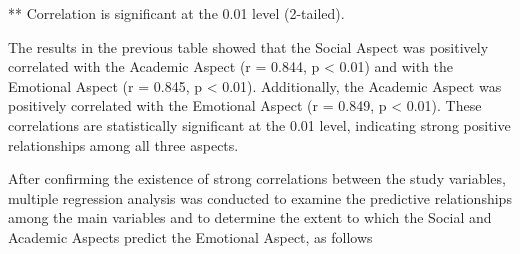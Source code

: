 \documentclass[10pt]{NSP1}
\begin{document}
** Correlation is significant at the 0.01 level (2-tailed).

The results in the previous table showed that the Social Aspect was positively correlated with the Academic Aspect (r = 0.844, p \textless{} 0.01) and with the Emotional Aspect (r = 0.845, p \textless{} 0.01). Additionally, the Academic Aspect was positively correlated with the Emotional Aspect (r = 0.849, p \textless{} 0.01). These correlations are statistically significant at the 0.01 level, indicating strong positive relationships among all three aspects.

After confirming the existence of strong correlations between the study variables, multiple regression analysis was conducted to examine the predictive relationships among the main variables and to determine the extent to which the Social and Academic Aspects predict the Emotional Aspect, as follows

\par\medskip{}\smallskip
\end{document}
